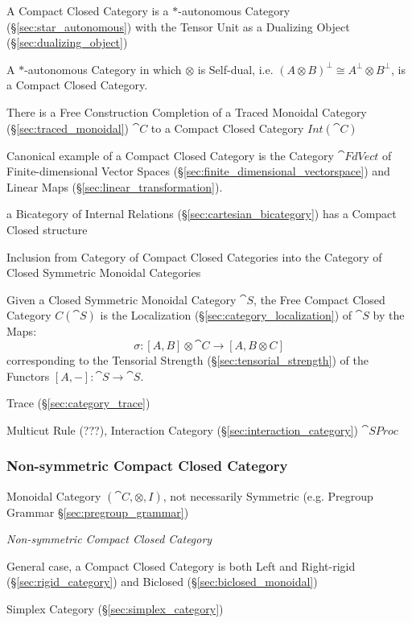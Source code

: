 A Compact Closed Category is a $*$-autonomous Category
(\S\ref{sec:star_autonomous}) with the Tensor Unit as a Dualizing
Object (\S\ref{sec:dualizing_object})

A $*$-autonomous Category in which $\otimes$ is Self-dual, i.e. $(A
\otimes B)^\bot \cong A^\bot \otimes B^\bot$, is a Compact Closed
Category. \cite{abramsky-gay-nagarajan96}

There is a Free Construction Completion of a Traced Monoidal Category
(\S\ref{sec:traced_monoidal}) $\cat{C}$ to a Compact Closed Category
$Int(\cat{C})$

Canonical example of a Compact Closed Category is the Category
$\cat{FdVect}$ of Finite-dimensional Vector Spaces
(\S\ref{sec:finite_dimensional_vectorspace}) and Linear Maps
(\S\ref{sec:linear_transformation}).

a Bicategory of Internal Relations (\S\ref{sec:cartesian_bicategory}) has a
Compact Closed structure

Inclusion from Category of Compact Closed Categories into the Category
of Closed Symmetric Monoidal Categories

Given a Closed Symmetric Monoidal Category $\cat{S}$, the Free Compact
Closed Category $C(\cat{S})$ is the Localization
(\S\ref{sec:category_localization}) of $\cat{S}$ by the Maps:
\[
  \sigma:[A,B] \otimes \cat{C} \rightarrow [A,B \otimes C]
\]
corresponding to the Tensorial Strength
(\S\ref{sec:tensorial_strength}) of the Functors $[A,-]: \cat{S}
\rightarrow \cat{S}$.

Trace (\S\ref{sec:category_trace})

Multicut Rule (???), Interaction Category
(\S\ref{sec:interaction_category}) $\cat{SProc}$



\subsubsection{Non-symmetric Compact Closed Category}
\label{sec:nonsymmetric_compact_closed}

Monoidal Category $(\cat{C}, \otimes, I)$, not necessarily Symmetric
(e.g. Pregroup Grammar \S\ref{sec:pregroup_grammar})

\emph{Non-symmetric Compact Closed Category}

General case, a Compact Closed Category is both Left and Right-rigid
(\S\ref{sec:rigid_category}) and Biclosed
(\S\ref{sec:biclosed_monoidal})

Simplex Category (\S\ref{sec:simplex_category})


